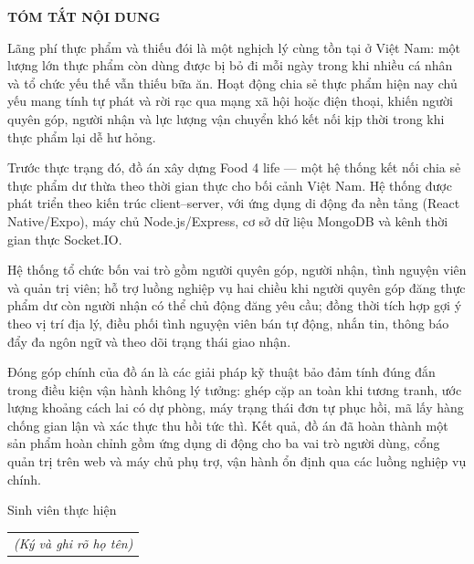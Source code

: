 \documentclass[../main.tex]{subfiles}
\begin{document}
\begin{center}
    \Large{\textbf{TÓM TẮT NỘI DUNG}}\\
\end{center}
\vspace{1cm}
\indent Lãng phí thực phẩm và thiếu đói là một nghịch lý cùng tồn tại ở Việt Nam: một lượng lớn thực phẩm còn dùng được bị bỏ đi mỗi ngày trong khi nhiều cá nhân và tổ chức yếu thế vẫn thiếu bữa ăn. Hoạt động chia sẻ thực phẩm hiện nay chủ yếu mang tính tự phát và rời rạc qua mạng xã hội hoặc điện thoại, khiến người quyên góp, người nhận và lực lượng vận chuyển khó kết nối kịp thời trong khi thực phẩm lại dễ hư hỏng.

\indent Trước thực trạng đó, đồ án xây dựng Food 4 life --- một hệ thống kết nối chia sẻ thực phẩm dư thừa theo thời gian thực cho bối cảnh Việt Nam. Hệ thống được phát triển theo kiến trúc client--server, với ứng dụng di động đa nền tảng (React Native/Expo), máy chủ Node.js/Express, cơ sở dữ liệu MongoDB và kênh thời gian thực Socket.IO.

\indent Hệ thống tổ chức bốn vai trò gồm người quyên góp, người nhận, tình nguyện viên và quản trị viên; hỗ trợ luồng nghiệp vụ hai chiều khi người quyên góp đăng thực phẩm dư còn người nhận có thể chủ động đăng yêu cầu; đồng thời tích hợp gợi ý theo vị trí địa lý, điều phối tình nguyện viên bán tự động, nhắn tin, thông báo đẩy đa ngôn ngữ và theo dõi trạng thái giao nhận.

\indent Đóng góp chính của đồ án là các giải pháp kỹ thuật bảo đảm tính đúng đắn trong điều kiện vận hành không lý tưởng: ghép cặp an toàn khi tương tranh, ước lượng khoảng cách lai có dự phòng, máy trạng thái đơn tự phục hồi, mã lấy hàng chống gian lận và xác thực thu hồi tức thì. Kết quả, đồ án đã hoàn thành một sản phẩm hoàn chỉnh gồm ứng dụng di động cho ba vai trò người dùng, cổng quản trị trên web và máy chủ phụ trợ, vận hành ổn định qua các luồng nghiệp vụ chính.
\begin{flushright}
Sinh viên thực hiện\\
\begin{tabular}{@{}c@{}}
\textit{(Ký và ghi rõ họ tên)}
\end{tabular}
\end{flushright}
\end{document}
